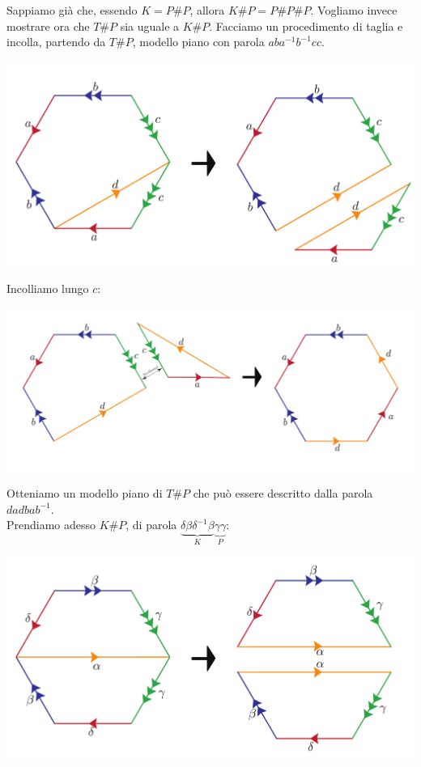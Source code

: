 \begin{demonstration}
	Sappiamo già che, essendo $K=P\# P$, allora $K\# P=P\# P\# P$. Vogliamo invece mostrare ora che $T\# P$ sia uguale a $K\# P$. Facciamo un procedimento di taglia e incolla, partendo da $T\# P$, modello piano con parola $aba^{-1}b^{-1}cc$.
	\begin{center}
			\includegraphics[trim=0cm 0cm 0cm 0cm, clip, scale=0.3]{images/torusplusproj1.pdf}
	\end{center}
Incolliamo lungo $c$:
\begin{center}
	\includegraphics[trim=0cm 0cm 0cm 0cm, clip, scale=0.3]{images/torusplusproj2.pdf}
\end{center}
Otteniamo un modello piano di $T\# P$ che può essere descritto dalla parola $dadbab^{-1}$.\\
Prendiamo adesso $K\# P$, di parola $\underbrace{\delta\beta\delta^{-1}\beta}_{K}\underbrace{\gamma\gamma}_{P}$:
\begin{center}
	\includegraphics[trim=0cm 0cm 0cm 0cm, clip, scale=0.3]{images/kleinplusproj1.pdf}

\end{center}
\end{demonstration}
